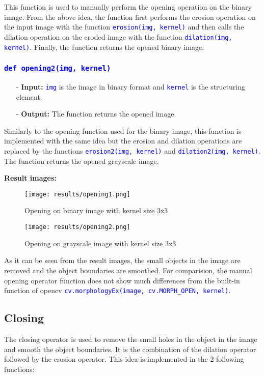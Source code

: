 \documentclass{report}
\begin{document}
This function is used to manually perform the opening operation on the binary image. From the above idea, the function first performs the erosion operation on the input image with the function \textcolor{blue}{\lstinline|erosion(img, kernel)|} and then calls the dilation operation on the eroded image with the function \textcolor{blue}{\lstinline|dilation(img, kernel)|}. Finally, the function returns the opened binary image.

\subsubsection*{\textcolor{blue}{\lstinline|def opening2(img, kernel)|}}

\begin{itemize}
  \item[-] \textbf{Input:} \textcolor{blue}{\lstinline|img|} is the image in binary format and \textcolor{blue}{\lstinline|kernel|} is the structuring element.
  \item[-] \textbf{Output:} The function returns the opened image.
\end{itemize}

Similarly to the opening function used for the binary image, this function is implemented with the same idea but the erosion and dilation operations are replaced by the functions \textcolor{blue}{\lstinline|erosion2(img, kernel)|} and \textcolor{blue}{\lstinline|dilation2(img, kernel)|}. The function returns the opened grayscale image.

\pagebreak
\textbf{Result images:}
\begin{figure}[H]
    \centering
    \texttt{[image: results/opening1.png]}
    \caption{Opening on binary image with kernel size 3x3}
    \bigskip
    \texttt{[image: results/opening2.png]}
    \caption{Opening on grayscale image with kernel size 3x3}
\end{figure}

As it can be seen from the result images, the small objects in the image are removed and the object boundaries are smoothed. For comparision, the manual opening operator function does not show much differences from the built-in function of opencv \textcolor{blue}{\lstinline|cv.morphologyEx(image, cv.MORPH_OPEN, kernel)|}.

\pagebreak
\subsection{Closing}
The closing operator is used to remove the small holes in the object in the image and smooth the object boundaries. It is the combination of the dilation operator followed by the erosion operator. This idea is implemented in the 2 following functions:
\end{document}
